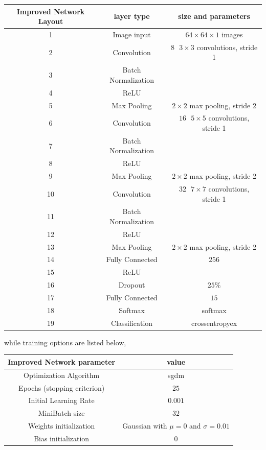 \documentclass[a4paper, 11pt]{article} %
\begin{document}
\begin{center}
\begin{tabular}{|c|c|c|}
\hline 
Improved Network Layout & layer type & size and parameters \\
\hline \hline 
1 & Image input & $64 \times 64 \times 1$ images \\
\hline 
2 & Convolution & $8 \mbox{ } 3 \times 3$ convolutions, stride 1 \\
\hline 
3 & Batch Normalization & \\
\hline
4 & ReLU &  \\
\hline 
5 & Max Pooling & $2 \times 2$ max pooling, stride 2 \\
\hline
6 & Convolution & $16 \mbox{ } 5 \times 5$ convolutions, stride 1 \\
\hline 
7 & Batch Normalization & \\
\hline
8 & ReLU &  \\
\hline 
9 & Max Pooling & $2 \times 2$ max pooling, stride 2 \\
\hline
10 & Convolution & $32 \mbox{ } 7 \times 7$ convolutions, stride 1 \\
\hline 
11 & Batch Normalization & \\
\hline
12 & ReLU & \\
\hline 
13 & Max Pooling & $2 \times 2$ max pooling, stride 2 \\
\hline
14 & Fully Connected & $256$ \\
\hline
15 & ReLU & \\
\hline
16 & Dropout & $25\%$ \\
\hline
17 & Fully Connected & $15$ \\
\hline
18 & Softmax & softmax \\
\hline \hline 
19 & Classification & crossentropyex \\
\hline
\end{tabular}
\end{center}
\bigskip

while training options are listed below,

\bigskip
\begin{center}
\begin{tabular}{|c|c|}
\hline 
Improved Network parameter & value \\
\hline \hline 
Optimization Algorithm & sgdm \\
\hline 
Epochs (stopping criterion) & $25$\\
\hline 
Initial Learning Rate & $0.001$\\
\hline
MiniBatch size & $32$ \\
\hline
Weights initialization & Gaussian with $\mu = 0$ and $\sigma = 0.01$\\
\hline 
Bias initialization & $0$\\
\hline
\end{tabular}
\end{center}
\bigskip
\end{document}
